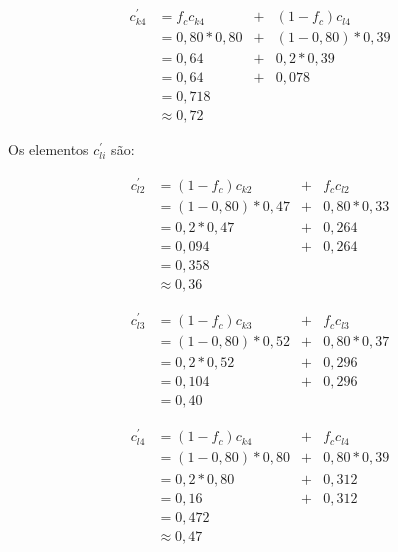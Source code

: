 	
	\begin{equation}
		\begin{array}{llcl}
			c^{'}_{k4}	& = f_c c_{k4} 		& + & (1- f_c) c_{l4} \\
									& = 0,80 * 0,80		& + &	(1 - 0,80) * 0,39 \\
									& = 0,64					& + & 0,2 * 0,39	\\
									& = 0,64					& + & 0,078	\\
									& = 0,718 \\
									& \approx 0,72
		\end{array}
	\end{equation}
	
	
	Os elementos $c^{'}_{li}$ são:
	
	\begin{equation}
		\begin{array}{llcl}
			c^{'}_{l2}	& = (1 - f_c) c_{k2} 		& + & f_c c_{l2} \\
									& = (1 - 0,80) * 0,47		& + &	0,80 * 0,33 \\
									& = 0,2 * 0,47					& + & 0,264	\\
									& = 0,094					& + & 0,264	\\
									& = 0,358 \\
									& \approx 0,36
		\end{array}
	\end{equation}
	
	\begin{equation}
		\begin{array}{llcl}
			c^{'}_{l3}	& = (1 - f_c) c_{k3} 		& + & f_c c_{l3} \\
									& = (1 - 0,80) * 0,52		& + &	0,80 * 0,37 \\
									& = 0,2 * 0,52					& + & 0,296	\\
									& = 0,104								& + & 0,296	\\
									& = 0,40									
		\end{array}
	\end{equation}
	
	
	\begin{equation}
		\begin{array}{llcl}
			c^{'}_{l4}	& = (1 - f_c) c_{k4} 		& + & f_c c_{l4} \\
									& = (1 - 0,80) * 0,80		& + &	0,80 * 0,39 \\
									& = 0,2 * 0,80					& + & 0,312	\\
									& = 0,16								& + & 0,312	\\
									& = 0,472 \\
									& \approx 0,47
		\end{array}
	\end{equation}
	
